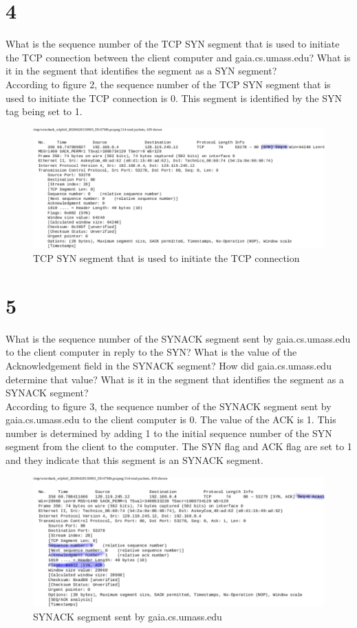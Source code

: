 \documentclass{article}
\begin{document}
\section*{4}
What is the sequence number of the TCP SYN segment that is used to initiate the
TCP connection between the client computer and gaia.cs.umass.edu? What is it
in the segment that identifies the segment as a SYN segment?\\
\newline According to figure 2, the sequence number of the TCP SYN segment that is used to initiate the TCP connection is 0.  This segment is identified by the SYN tag being set to 1.\\
\begin{figure}[h!]
\centering
\includegraphics[scale=0.5]{Q4.pdf}
\caption{TCP SYN segment that is used to initiate the TCP connection}
\end{figure}
\section*{5}
What is the sequence number of the SYNACK segment sent by gaia.cs.umass.edu
to the client computer in reply to the SYN? What is the value of the
Acknowledgement field in the SYNACK segment? How did gaia.cs.umass.edu
determine that value? What is it in the segment that identifies the segment as a
SYNACK segment?\\
\newline According to figure 3, the sequence number of the SYNACK segment sent by gaia.cs.umass.edu
to the client computer is 0.  The value of the ACK is 1.  This number is determined by adding 1 to the initial sequence number of the SYN segment from the client to the computer.  The SYN flag and ACK flag are set to 1 and they indicate that this segment is an SYNACK segment.\\
\begin{figure}[h!]
\centering
\includegraphics[scale=0.5]{Q5.pdf}
\caption{SYNACK segment sent by gaia.cs.umass.edu}
\end{figure}
\clearpage
\end{document}
